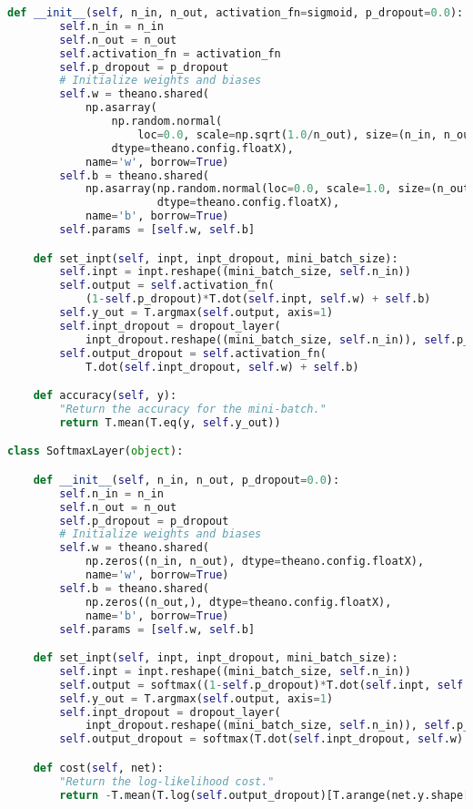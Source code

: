 \begin{fullwidth}
\begin{lstlisting}[caption={network3.py (Python 2.7)},label={lst:network3.py}, language=Python]
    def __init__(self, n_in, n_out, activation_fn=sigmoid, p_dropout=0.0):
        self.n_in = n_in
        self.n_out = n_out
        self.activation_fn = activation_fn
        self.p_dropout = p_dropout
        # Initialize weights and biases
        self.w = theano.shared(
            np.asarray(
                np.random.normal(
                    loc=0.0, scale=np.sqrt(1.0/n_out), size=(n_in, n_out)),
                dtype=theano.config.floatX),
            name='w', borrow=True)
        self.b = theano.shared(
            np.asarray(np.random.normal(loc=0.0, scale=1.0, size=(n_out,)),
                       dtype=theano.config.floatX),
            name='b', borrow=True)
        self.params = [self.w, self.b]

    def set_inpt(self, inpt, inpt_dropout, mini_batch_size):
        self.inpt = inpt.reshape((mini_batch_size, self.n_in))
        self.output = self.activation_fn(
            (1-self.p_dropout)*T.dot(self.inpt, self.w) + self.b)
        self.y_out = T.argmax(self.output, axis=1)
        self.inpt_dropout = dropout_layer(
            inpt_dropout.reshape((mini_batch_size, self.n_in)), self.p_dropout)
        self.output_dropout = self.activation_fn(
            T.dot(self.inpt_dropout, self.w) + self.b)

    def accuracy(self, y):
        "Return the accuracy for the mini-batch."
        return T.mean(T.eq(y, self.y_out))

class SoftmaxLayer(object):

    def __init__(self, n_in, n_out, p_dropout=0.0):
        self.n_in = n_in
        self.n_out = n_out
        self.p_dropout = p_dropout
        # Initialize weights and biases
        self.w = theano.shared(
            np.zeros((n_in, n_out), dtype=theano.config.floatX),
            name='w', borrow=True)
        self.b = theano.shared(
            np.zeros((n_out,), dtype=theano.config.floatX),
            name='b', borrow=True)
        self.params = [self.w, self.b]

    def set_inpt(self, inpt, inpt_dropout, mini_batch_size):
        self.inpt = inpt.reshape((mini_batch_size, self.n_in))
        self.output = softmax((1-self.p_dropout)*T.dot(self.inpt, self.w) + self.b)
        self.y_out = T.argmax(self.output, axis=1)
        self.inpt_dropout = dropout_layer(
            inpt_dropout.reshape((mini_batch_size, self.n_in)), self.p_dropout)
        self.output_dropout = softmax(T.dot(self.inpt_dropout, self.w) + self.b)

    def cost(self, net):
        "Return the log-likelihood cost."
        return -T.mean(T.log(self.output_dropout)[T.arange(net.y.shape[0]), net.y])


\end{lstlisting}
\end{fullwidth}
